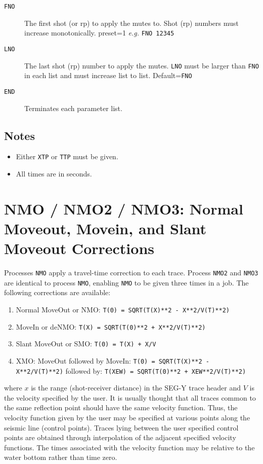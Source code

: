 \begin{description}
\item[\texttt{FNO}] The first \gls{shot} (or \gls{rp}) to apply the mutes to.  Shot (\gls{rp})
         numbers must increase monotonically.
         \Gls{preset}=1        \textit{e.g.} \texttt{FNO 12345}

\item[\texttt{LNO}] The last \gls{shot} (\gls{rp}) number to apply the mutes.  \texttt{LNO} must be
         larger than \texttt{FNO} in each list and must increase list to list.
         Default=\texttt{FNO}

\item[\texttt{END}] Terminates each parameter list.
\end{description}

\subsection{Notes}
\begin{itemize}
\item Either \texttt{XTP} or \texttt{TTP} must be given.
\item All times are in seconds.
\end{itemize}

\section{NMO / NMO2 / NMO3: Normal Moveout, Movein, and Slant Moveout Corrections}
\label{cmd_nmo}

Processes \texttt{NMO} apply a travel-time correction to each trace.
Process \texttt{NMO2} and \texttt{NMO3} are identical to process \texttt{NMO}, enabling \texttt{NMO} to be
given three times in a job.  The following corrections are available:

\begin{enumerate}
    \item  Normal MoveOut or NMO: \texttt{T(0) = SQRT(T(X)**2 - X**2/V(T)**2)}
    \item  MoveIn or deNMO: \texttt{T(X) = SQRT(T(0)**2 + X**2/V(T)**2)}
    \item  Slant MoveOut or SMO:  \texttt{T(0) = T(X) + X/V}
    \item  XMO: MoveOut followed by MoveIn: \texttt{T(0) = SQRT(T(X)**2 - X**2/V(T)**2)}
        followed by: \texttt{T(XEW) = SQRT(T(0)**2 + XEW**2/V(T)**2)}
\end{enumerate}

where $x$ is the range (shot-receiver distance) in the SEG-Y trace header
and $V$ is the velocity specified by the user.  It is usually thought that
all traces common to the same reflection point should have the same
velocity function.  Thus, the velocity function given by the user may be
specified at various points along the seismic line (control points).
Traces lying between the user specified control points are obtained
through interpolation of the adjacent specified velocity functions.  The
times associated with the velocity function may be relative to the water
bottom rather than time zero.


